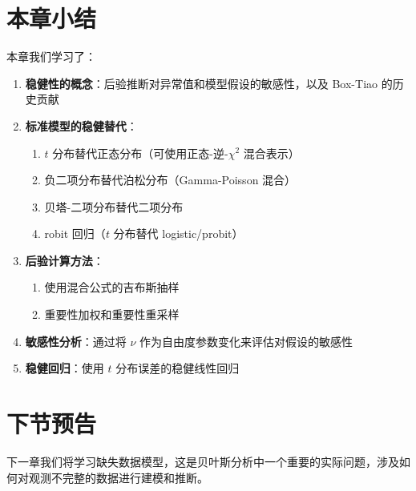 \section{本章小结}

本章我们学习了：

\begin{enumerate}
  \item \textbf{稳健性的概念}：后验推断对异常值和模型假设的敏感性，以及 Box-Tiao 的历史贡献
  \item \textbf{标准模型的稳健替代}：
  \begin{enumerate}
    \item $t$ 分布替代正态分布（可使用正态-逆-$\chi^2$ 混合表示）
    \item 负二项分布替代泊松分布（Gamma-Poisson 混合）
    \item 贝塔-二项分布替代二项分布
    \item robit 回归（$t$ 分布替代 logistic/probit）
  \end{enumerate}
  \item \textbf{后验计算方法}：
  \begin{enumerate}
    \item 使用混合公式的吉布斯抽样
    \item 重要性加权和重要性重采样
  \end{enumerate}
  \item \textbf{敏感性分析}：通过将 $\nu$ 作为自由度参数变化来评估对假设的敏感性
  \item \textbf{稳健回归}：使用 $t$ 分布误差的稳健线性回归
\end{enumerate}

\section{下节预告}

下一章我们将学习缺失数据模型，这是贝叶斯分析中一个重要的实际问题，涉及如何对观测不完整的数据进行建模和推断。

\endinput
